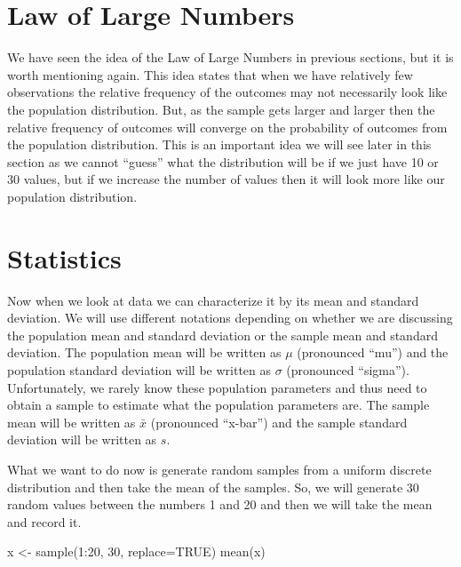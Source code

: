 \documentclass[
  letterpaper,
  DIV=11,
  numbers=noendperiod]{scrreprt}
\newenvironment{Shaded}{\begin{snugshade}}{\end{snugshade}}
\newcommand{\AttributeTok}[1]{\textcolor[rgb]{0.40,0.45,0.13}{#1}}
\newcommand{\ConstantTok}[1]{\textcolor[rgb]{0.56,0.35,0.01}{#1}}
\newcommand{\DecValTok}[1]{\textcolor[rgb]{0.68,0.00,0.00}{#1}}
\newcommand{\FunctionTok}[1]{\textcolor[rgb]{0.28,0.35,0.67}{#1}}
\newcommand{\NormalTok}[1]{\textcolor[rgb]{0.00,0.23,0.31}{#1}}
\newcommand{\OtherTok}[1]{\textcolor[rgb]{0.00,0.23,0.31}{#1}}
\newcommand{\SpecialCharTok}[1]{\textcolor[rgb]{0.37,0.37,0.37}{#1}}
\begin{document}
\section{Law of Large Numbers}\label{law-of-large-numbers}

We have seen the idea of the Law of Large Numbers in previous sections,
but it is worth mentioning again. This idea states that when we have
relatively few observations the relative frequency of the outcomes may
not necessarily look like the population distribution. But, as the
sample gets larger and larger then the relative frequency of outcomes
will converge on the probability of outcomes from the population
distribution. This is an important idea we will see later in this
section as we cannot ``guess'' what the distribution will be if we just
have 10 or 30 values, but if we increase the number of values then it
will look more like our population distribution.

\section{Statistics}\label{statistics}

Now when we look at data we can characterize it by its mean and standard
deviation. We will use different notations depending on whether we are
discussing the population mean and standard deviation or the sample mean
and standard deviation. The population mean will be written as \(\mu\)
(pronounced ``mu'') and the population standard deviation will be
written as \(\sigma\) (pronounced ``sigma''). Unfortunately, we rarely
know these population parameters and thus need to obtain a sample to
estimate what the population parameters are. The sample mean will be
written as \(\bar{x}\) (pronounced ``x-bar'') and the sample standard
deviation will be written as \(s\).

What we want to do now is generate random samples from a uniform
discrete distribution and then take the mean of the samples. So, we will
generate 30 random values between the numbers 1 and 20 and then we will
take the mean and record it.

\begin{Shaded}
\begin{Highlighting}[]
\NormalTok{x }\OtherTok{\textless{}{-}} \FunctionTok{sample}\NormalTok{(}\DecValTok{1}\SpecialCharTok{:}\DecValTok{20}\NormalTok{, }\DecValTok{30}\NormalTok{, }\AttributeTok{replace=}\ConstantTok{TRUE}\NormalTok{)}
\FunctionTok{mean}\NormalTok{(x)}
\end{Highlighting}
\end{Shaded}
\end{document}
